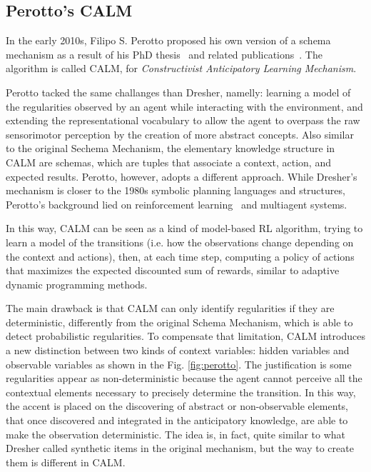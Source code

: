 \documentclass[runningheads]{llncs}
\begin{document}
\subsection{Perotto's CALM}

In the early 2010s, Filipo S. Perotto proposed his own version of a schema mechanism as a result of his PhD thesis~\cite{Perotto:2010:INP} and related publications~\cite{Perotto:2006:AAMAS,Perotto:2006:SGAI,Perotto:2007:EpiRob,Perotto:2013:CF}.
The algorithm is called CALM, for \textit{Constructivist Anticipatory Learning Mechanism}.

Perotto tacked the same challanges than Dresher, namelly: learning a model of the regularities observed by an agent while interacting with the environment, and extending the representational vocabulary to allow the agent to overpass the raw sensorimotor perception by the creation of more abstract concepts.
Also similar to the original Sechema Mechanism, the elementary knowledge structure in CALM are schemas, which are tuples that associate a context, action, and expected results.
Perotto, however, adopts a different approach.
While Dresher's mechanism is closer to the 1980s symbolic planning languages and structures, Perotto's background lied on reinforcement learning~\cite{Sutton:2018} and multiagent systems.

In this way, CALM can be seen as a kind of model-based RL algorithm, trying to learn a model of the transitions (i.e. how the observations change depending on the context and actions), then, at each time step, computing a policy of actions that maximizes the expected discounted sum of rewards, similar to adaptive dynamic programming methods.

The main drawback is that CALM can only identify regularities if they are deterministic, differently from the original Schema Mechanism, which is able to detect probabilistic regularities. 
To compensate that limitation, CALM introduces a new distinction between two kinds of context variables: hidden variables and observable variables as shown in the Fig. \ref{fig:perotto}.
The justification is some regularities appear as non-deterministic because the agent cannot perceive all the contextual elements necessary to precisely determine the transition.
In this way, the accent is placed on the discovering of abstract or non-observable elements, that once discovered and integrated in the anticipatory knowledge, are able to make the observation deterministic. The idea is, in fact, quite similar to what Dresher called synthetic items in the original mechanism, but the way to create them is different in CALM.
\end{document}

